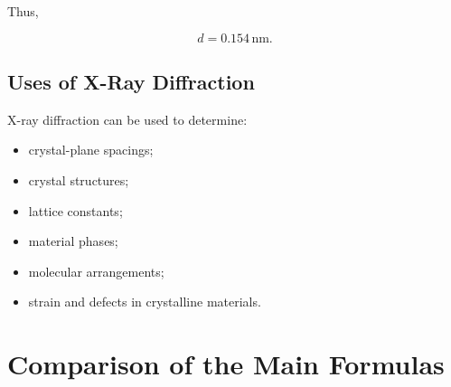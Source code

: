 \documentclass{studentnotes}
\begin{document}
Thus,

\[
    \boxed{
        d=0.154\,\text{nm}.
    }
\]

\subsection{Uses of X-Ray Diffraction}

X-ray diffraction can be used to determine:

\begin{itemize}
    \item crystal-plane spacings;
    \item crystal structures;
    \item lattice constants;
    \item material phases;
    \item molecular arrangements;
    \item strain and defects in crystalline materials.
\end{itemize}

\section{Comparison of the Main Formulas}
\end{document}
